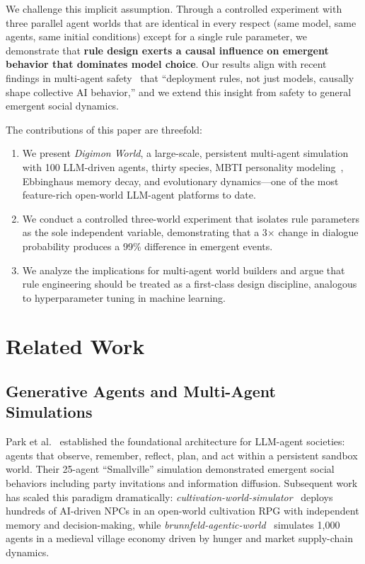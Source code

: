\documentclass[11pt]{article}
\begin{document}
We challenge this implicit assumption.
Through a controlled experiment with three parallel agent worlds that are identical in every respect (same model, same agents, same initial conditions) except for a single rule parameter, we demonstrate that \textbf{rule design exerts a causal influence on emergent behavior that dominates model choice}.
Our results align with recent findings in multi-agent safety~\cite{institutional2026redteaming} that ``deployment rules, not just models, causally shape collective AI behavior,'' and we extend this insight from safety to general emergent social dynamics.

The contributions of this paper are threefold:
\begin{enumerate}[leftmargin=*,nosep]
    \item We present \emph{Digimon World}, a large-scale, persistent multi-agent simulation with 100 LLM-driven agents, thirty species, MBTI personality modeling~\cite{agenttopia2026personality}, Ebbinghaus memory decay, and evolutionary dynamics---one of the most feature-rich open-world LLM-agent platforms to date.
    \item We conduct a controlled three-world experiment that isolates rule parameters as the sole independent variable, demonstrating that a 3$\times$ change in dialogue probability produces a 99\% difference in emergent events.
    \item We analyze the implications for multi-agent world builders and argue that rule engineering should be treated as a first-class design discipline, analogous to hyperparameter tuning in machine learning.
\end{enumerate}

\section{Related Work}
\label{sec:related}

\subsection{Generative Agents and Multi-Agent Simulations}

Park et al.~\cite{park2023generative} established the foundational architecture for LLM-agent societies: agents that observe, remember, reflect, plan, and act within a persistent sandbox world.
Their 25-agent ``Smallville'' simulation demonstrated emergent social behaviors including party invitations and information diffusion.
Subsequent work has scaled this paradigm dramatically: \emph{cultivation-world-simulator}~\cite{cultivation2026world} deploys hundreds of AI-driven NPCs in an open-world cultivation RPG with independent memory and decision-making, while \emph{brunnfeld-agentic-world}~\cite{brunnfeld2026agentic} simulates 1{,}000 agents in a medieval village economy driven by hunger and market supply-chain dynamics.
\end{document}
